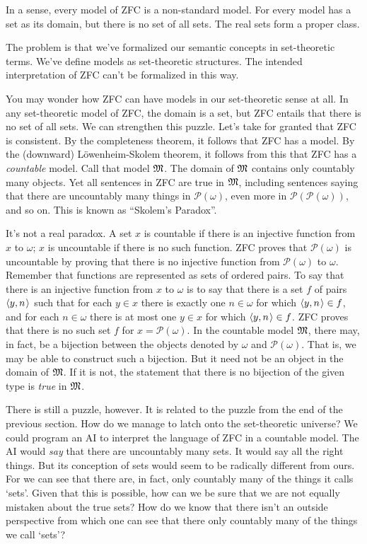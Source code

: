 In a sense,
every model of ZFC is a non-standard model.
For every model has a set as its domain,
but there is no set of all sets.
The real sets form a proper class.

The problem is that
we've formalized our semantic concepts in set-theoretic terms.
We've define models as set-theoretic structures.
The intended interpretation of ZFC can't be formalized in this way.

You may wonder how ZFC can have models in our set-theoretic sense at all.
In any set-theoretic model of ZFC,
the domain is a set,
but ZFC entails that there is no set of all sets.
We can strengthen this puzzle.
Let's take for granted that ZFC is consistent.
By the completeness theorem,
it follows that ZFC has a model.
By the (downward) Löwenheim-Skolem theorem,
it follows from this
that ZFC has a \emph{countable} model.
Call that model $\mathfrak{M}$.
The domain of $\mathfrak{M}$ contains only countably many objects.
Yet all sentences in ZFC are true in $\mathfrak{M}$,
including sentences saying that
there are uncountably many things in $\mathcal{P}(\omega)$,
even more in $\mathcal{P}(\mathcal{P}(\omega))$, and so on.
This is known as ``Skolem's Paradox''.

It's not a real paradox.
A set $x$ is countable if
there is an injective function from  $x$ to $\omega$;
$x$ is uncountable if there is no such function.
ZFC proves that $\mathcal{P}(\omega)$ is uncountable by proving that
there is no injective function from $\mathcal{P}(\omega)$ to $\omega$.
Remember that functions are represented as sets of ordered pairs.
To say that there is an injective function from $x$ to $\omega$ is to say that
there is a set $f$ of pairs $\t{y,n}$ such that
for each $y \in x$ there is exactly one $n \in \omega$ for which $\t{y,n} \in f$,
and for each $n \in \omega$ there is at most one $y \in x$ for which $\t{y,n} \in f$.
ZFC proves that there is no such set $f$ for $x = \mathcal{P}(\omega)$.
In the countable model $\mathfrak{M}$,
there may, in fact, be a bijection between the objects denoted by $\omega$ and $\mathcal{P}(\omega)$.
That is,
we may be able to construct such a bijection.
But it need not be an object in the domain of $\mathfrak{M}$.
If it is not,
the statement that there is no bijection of the given type is \emph{true} in $\mathfrak{M}$.

There is still a puzzle, however.
It is related to the puzzle from the end of the previous section.
How do we manage to latch onto the set-theoretic universe?
We could program an AI to interpret the language of ZFC in a countable model.
The AI would \emph{say} that there are uncountably many sets.
It would say all the right things.
But its conception of sets would seem to be radically different from ours.
For we can see that
there are, in fact, only countably many of the things it calls `sets'.
Given that this is possible,
how can we be sure that we are not equally mistaken about the true sets?
How do we know that
there isn't an outside perspective from which
one can see that
there only countably many of the things we call `sets'?

